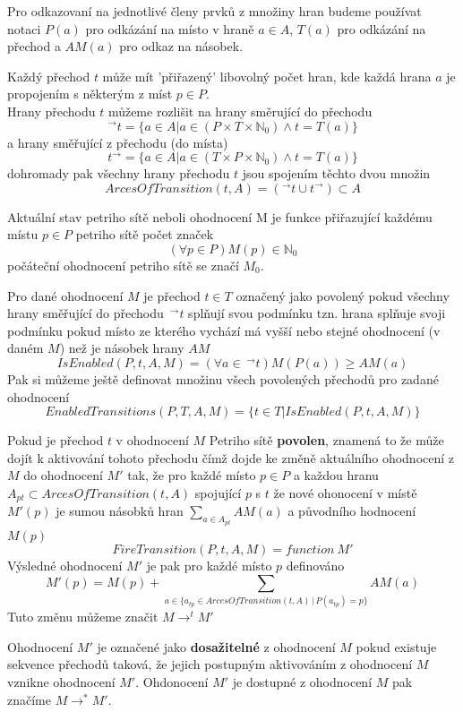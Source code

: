 \documentclass[
  biblatex,
  glossaries,
  index
]{kidiplom}
\begin{document}
Pro odkazovaní na jednotlivé členy prvků z množiny hran budeme používat
notaci $P(a)$ pro odkázání na místo v hraně $a \in A$,
$T(a)$ pro odkázání na přechod a $AM(a)$ pro odkaz na násobek.

Každý přechod $t$ může mít 'přiřazený' libovolný počet
hran, kde každá hrana $a$ je propojením s některým z míst $p \in P$.\\
Hrany přechodu $t$ můžeme rozlišit na hrany směrující do přechodu
$$^\to t = \{a \in A | a \in (P \times T \times \mathbb{N}_0) \land t = T(a)\}$$
a hrany směřující z přechodu (do místa)
$$ t ^\to  = \{a \in A | a \in (T \times P \times \mathbb{N}_0) \land t = T(a)\}$$
dohromady pak všechny hrany přechodu $t$ jsou spojením těchto dvou množin
$$ArcesOfTransition(t,A) = (^\to t \cup t ^\to) \subset A$$

Aktuální stav petriho sítě neboli ohodnocení M je funkce přiřazující každému
místu $p \in P$ petriho sítě počet značek
$$(\forall p \in P) M(p) \in \mathbb{N}_0$$
počáteční ohodnocení petriho sítě se značí $M_{0}$.

Pro dané ohodnocení $M$ je přechod $t \in T$ označený jako povolený
pokud všechny hrany směřující do přechodu $\,^\to t$ splňují svou podmínku tzn.
hrana splňuje svoji podmínku pokud místo ze kterého vychází má vyšší nebo stejné ohodnocení
(v daném $M$) než je násobek hrany $AM$
$$IsEnabled(P,t,A,M) = (\forall a \in \,^\to t)M(P(a)) \geq AM(a)$$
Pak si můžeme ještě definovat množinu všech povolených přechodů pro zadané ohodnocení
$$
  EnabledTransitions(P,T,A,M) =
  \{ t \in T | IsEnabled(P,t,A,M) \}
$$

Pokud je přechod $t$ v ohodnocení $M$ Petriho sítě \textbf{povolen}, znamená to že může dojít
k aktivování tohoto přechodu čímž dojde ke změně aktuálního ohodnocení z $M$ do ohodnocení $M'$
tak, že pro každé místo $p \in P$ a každou hranu $A_{pt} \subset ArcesOfTransition(t,A)$ spojující $p$ s $t$
že nové ohonocení v místě $M'(p)$ je sumou násobků hran $\sum_{a \in A_{pt}} AM(a)$ a původního hodnocení $M(p)$
$$
  FireTransition(P,t,A,M) = function\:M'
$$
Výsledné ohodnocení $M'$ je pak pro každé místo $p$ definováno
$$
  M'(p) = M(p) + \sum_{a \in \{a_{tp} \in ArcesOfTransition(t,A) \,|\, P(a_{tp}) = p \}} AM(a)
$$
Tuto změnu můžeme značit $M \to ^t M'$

Ohodnocení $M'$ je označené jako \textbf{dosažitelné} z ohodnocení $M$ 
pokud existuje sekvence přechodů taková, že jejich postupným aktivováním
z ohodnocení $M$ vznikne ohodnocení $M'$.
Ohdonocení $M'$ je dostupné z ohodnocení $M$ pak značíme $M \to ^* M'$.
\end{document}
